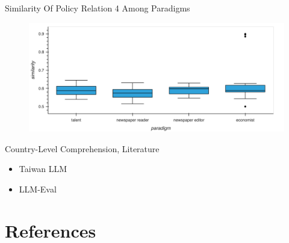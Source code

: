 \documentclass[12pt]{beamer}
\begin{document}
\begin{frame}{Similarity Of Policy Relation 4 Among Paradigms}
\begin{figure}[H]
\centering
\includegraphics[width=11.5cm]{Figures/fig34.png}
\end{figure}
\end{frame}


\begin{frame}{Country-Level Comprehension, Literature}
\begin{itemize}
    \item Taiwan LLM
    \item LLM-Eval
\end{itemize}
\end{frame}


\section{References}


\begin{frame}[allowframebreaks]{}
\renewcommand{\section}[2]{}%

\end{frame}
\end{document}
